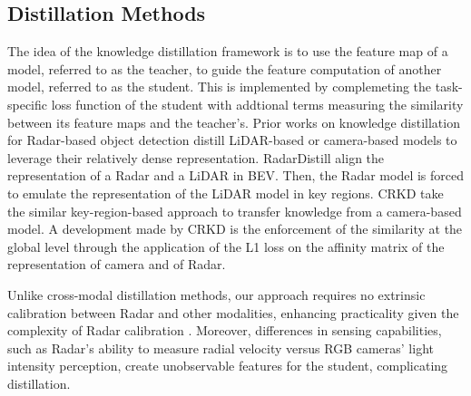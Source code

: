 \subsection{Distillation Methods}
The idea of the knowledge distillation framework \cite{hinton2015distilling} is to use the feature map of a model, referred to as the teacher, to guide the feature computation of another model, referred to as the student.
This is implemented by complemeting the task-specific loss function of the student with addtional terms measuring the similarity between its feature maps and the teacher's.
Prior works on knowledge distillation for Radar-based object detection distill LiDAR-based or camera-based models to leverage their relatively dense representation.
RadarDistill \cite{bang2024radardistill} align the representation of a Radar and a LiDAR in BEV.
Then, the Radar model is forced to emulate the representation of the LiDAR model in key regions.
CRKD \cite{zhao2024crkd} take the similar key-region-based approach to transfer knowledge from a camera-based model.
A development made by CRKD is the enforcement of the similarity at the global level through the application of the L1 loss on the affinity matrix of the representation of camera and of Radar.

Unlike cross-modal distillation methods, our approach requires no extrinsic calibration between Radar and other modalities, enhancing practicality given the complexity of Radar calibration \cite{domhof2021joint, li2023globally}. Moreover, differences in sensing capabilities, such as Radar's ability to measure radial velocity versus RGB cameras' light intensity perception, create unobservable features for the student, complicating distillation.

